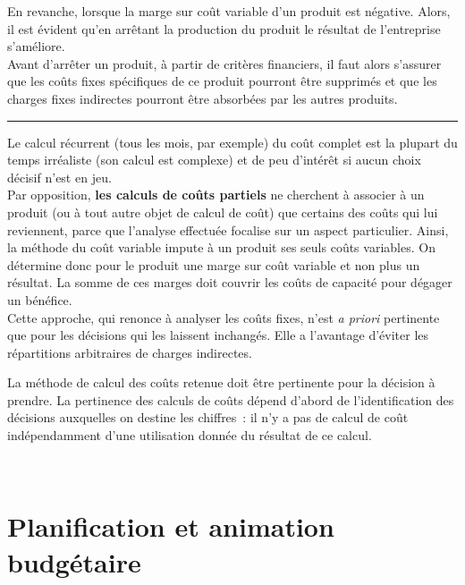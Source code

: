 \documentclass{tufte-handout}
\begin{document}
En revanche, lorsque la marge sur coût variable d'un produit est négative. Alors, il est évident qu'en arrêtant la production du produit le résultat de l'entreprise s'améliore.\\

Avant d'arrêter un produit, à partir de critères financiers, il faut alors s'assurer que les coûts fixes spécifiques de ce produit pourront être supprimés et que les charges fixes indirectes pourront être absorbées par les autres produits.\\

\noindent\rule{\textwidth}{0.5pt}

Le calcul récurrent (tous les mois, par exemple) du coût complet est la plupart du temps irréaliste (son calcul est complexe) et de peu d'intérêt si aucun choix décisif n'est en jeu.\\

Par opposition, \textbf{les calculs de coûts partiels} ne cherchent à associer à un produit (ou à tout autre objet de calcul de coût) que certains des coûts qui lui reviennent, parce que l'analyse effectuée focalise sur un aspect particulier. Ainsi, la méthode du coût variable impute à un produit ses seuls coûts variables. On détermine donc pour le produit une marge sur coût variable et non plus un résultat. La somme de ces marges doit couvrir les coûts de capacité pour dégager un bénéfice.\\
Cette approche, qui renonce à analyser les coûts fixes, n'est \emph{a priori} pertinente que pour les décisions qui les laissent inchangés. Elle a l'avantage d'éviter les répartitions arbitraires de charges indirectes.\\

\begin{warning}
La méthode de calcul des coûts retenue doit être pertinente pour la décision à prendre. La pertinence des calculs de coûts dépend d'abord de l'identification des décisions auxquelles on destine les chiffres : il n'y a pas de calcul de coût indépendamment d'une utilisation donnée du résultat de ce calcul.\\
\end{warning}

\clearpage\\
\section{Planification et animation budgétaire}
\label{sec:org9af883c}
\end{document}
